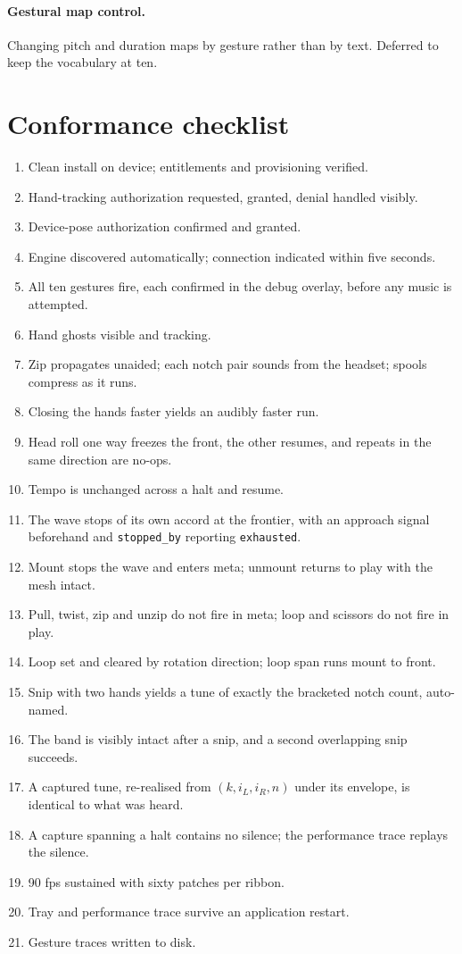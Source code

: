 \documentclass[11pt,a4paper]{article}
\theoremstyle{definition}
\theoremstyle{plain}
\theoremstyle{remark}
\begin{document}
\paragraph{Gestural map control.} Changing pitch and duration maps by gesture rather than by text.
Deferred to keep the vocabulary at ten.

\section{Conformance checklist}

\begin{enumerate}[leftmargin=*,itemsep=0.15em]
\item Clean install on device; entitlements and provisioning verified.
\item Hand-tracking authorization requested, granted, denial handled visibly.
\item Device-pose authorization confirmed and granted.
\item Engine discovered automatically; connection indicated within five seconds.
\item All ten gestures fire, each confirmed in the debug overlay, before any music is attempted.
\item Hand ghosts visible and tracking.
\item Zip propagates unaided; each notch pair sounds from the headset; spools compress as it runs.
\item Closing the hands faster yields an audibly faster run.
\item Head roll one way freezes the front, the other resumes, and repeats in the same direction are
      no-ops.
\item Tempo is unchanged across a halt and resume.
\item The wave stops of its own accord at the frontier, with an approach signal beforehand and
      \texttt{stopped\_by} reporting \texttt{exhausted}.
\item Mount stops the wave and enters meta; unmount returns to play with the mesh intact.
\item Pull, twist, zip and unzip do not fire in meta; loop and scissors do not fire in play.
\item Loop set and cleared by rotation direction; loop span runs mount to front.
\item Snip with two hands yields a tune of exactly the bracketed notch count, auto-named.
\item The band is visibly intact after a snip, and a second overlapping snip succeeds.
\item A captured tune, re-realised from $(k,i_L,i_R,n)$ under its envelope, is identical to what was
      heard.
\item A capture spanning a halt contains no silence; the performance trace replays the silence.
\item 90 fps sustained with sixty patches per ribbon.
\item Tray and performance trace survive an application restart.
\item Gesture traces written to disk.
\end{enumerate}
\end{document}
